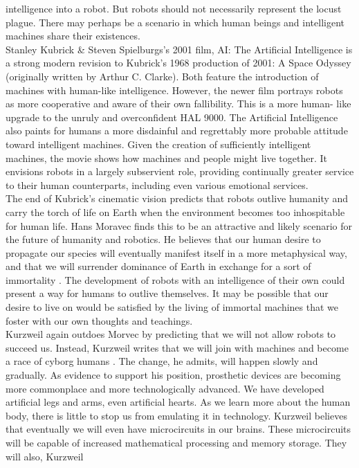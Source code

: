 intelligence into a robot. But robots should not necessarily represent the locust plague.
There may perhaps be a scenario in which human beings and intelligent machines share
their existences.\\
Stanley Kubrick & Steven Spielburgs’s 2001 film, AI: The Artificial Intelligence
is a strong modern revision to Kubrick’s 1968 production of 2001: A Space Odyssey
(originally written by Arthur C. Clarke). Both feature the introduction of machines with
human-like intelligence. However, the newer film portrays robots as more cooperative
and aware of their own fallibility. This is a more human- like upgrade to the unruly and
overconfident HAL 9000. The Artificial Intelligence also paints for humans a more
disdainful and regrettably more probable attitude toward intelligent machines. Given the
creation of sufficiently intelligent machines, the movie shows how machines and people
might live together. It envisions robots in a largely subservient role, providing
continually greater service to their human counterparts, including even various emotional
services.\\
The end of Kubrick’s cinematic vision predicts that robots outlive humanity and
carry the torch of life on Earth when the environment becomes too inhospitable for
human life. Hans Moravec finds this to be an attractive and likely scenario for the future
of humanity and robotics. He believes that our human desire to propagate our species
will eventually manifest itself in a more metaphysical way, and that we will surrender
dominance of Earth in exchange for a sort of immortality \cite{seven}. The development
of robots with an intelligence of their own could present a way for humans to outlive themselves. It may be possible that our desire to live on would be satisfied by the living
of immortal machines that we foster with our own thoughts and teachings.\\
Kurzweil again outdoes Morvec by predicting that we will not allow robots to
succeed us. Instead, Kurzweil writes that we will join with machines and become a race
of cyborg humans . The change, he admits, will happen slowly and
gradually. As evidence to support his position, prosthetic devices are becoming more
commonplace and more technologically advanced. We have developed artificial legs and
arms, even artificial hearts. As we learn more about the human body, there is little to
stop us from emulating it in technology. Kurzweil believes that eventually we will even
have microcircuits in our brains. These microcircuits will be capable of
increased mathematical processing and memory storage. They will also, Kurzweil
